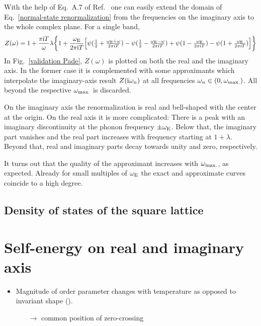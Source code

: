 With the help of Eq.~A.7 of Ref.~ one can easily
extend the domain of Eq.~\ref{normal-state renormalization} from the
 frequencies on the imaginary axis to the whole complex plane.
For a single band,
%
\begin{equation*}
    Z(\omega) = 1 + \frac {\pi \mathrm i T} \omega \lambda \bigg \{
        1 + \frac{\omega \sb{\text{E}}}{2 \pi \mathrm i T} \Big[
              \psi(\tfrac 1 2 + \tfrac{\omega \sb{\text{E}} + \omega}{2 \pi \mathrm i T})
            - \psi(\tfrac 1 2 - \tfrac{\omega \sb{\text{E}} - \omega}{2 \pi \mathrm i T})
            + \psi(1 - \tfrac{\omega \sb{\text{E}}}{2 \pi \mathrm i T})
            - \psi(1 + \tfrac{\omega \sb{\text{E}}}{2 \pi \mathrm i T})
        \Big]
    \bigg \}
\end{equation*}
%
In Fig.~\ref{validation Pade}, $Z(\omega)$ is plotted on both the real and the
imaginary axis. In the former case it is complemented with some 
approximants which interpolate the imaginary-axis result $Z(\mathrm i \omega_n)$ at all
 frequencies $\omega_n \in (0, \omega \sb{\text{max.}})$. All beyond
the respective $\omega \sb{\text{max.}}$ is discarded.

On the imaginary axis the renormalization is real and bell-shaped with the
center at the origin. On the real axis it is more complicated: There is a peak
with an imaginary discontinuity at the phonon frequency $\pm \omega \sb{\text{E}}$.
Below that, the imaginary part vanishes and the real part increases with
frequency starting at $1 + \lambda$. Beyond that, real and imaginary parts decay
towards unity and zero, respectively.

It turns out that the quality of the  approximant increases with
$\omega \sb{\text{max.}}$, as expected. Already for small multiples of $\omega \sb{\text{E}}$
the exact and approximate curves coincide to a high degree.

\subsection{Density of states of the square lattice}

\section{Self-energy on real and imaginary axis}

\begin{itemize}
    \item Magnitude of order parameter changes with temperature as opposed to
          invariant shape ().
    \begin{itemize}
        \item[$\rightarrow$] common position of zero-crossing
    \end{itemize}
\end{itemize}

